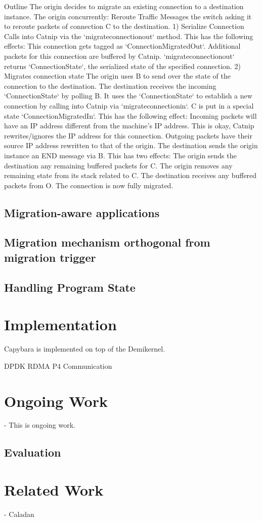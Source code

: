 Outline
The origin decides to migrate an existing connection to a destination instance.
The origin concurrently:
Reroute Traffic
Messages the switch asking it to reroute packets of connection C to the destination. 
1) Serialize Connection
Calls into Catnip via the `migrate\textunderscore{}connection\textunderscore{}out` method. This has the following effects:
This connection gets tagged as `ConnectionMigratedOut`.
Additional packets for this connection are buffered by Catnip.
`migrate\textunderscore{}connection\textunderscore{}out` returns `ConnectionState`, the serialized state of the specified connection.
2) Migrates connection state
The origin uses B to send over the state of the connection to the destination.
The destination receives the incoming `ConnectionState` by polling B. It uses the `ConnectionState` to establish a new connection by calling into Catnip via `migrate\textunderscore{}connection\textunderscore{}in`. C is put in a special state `ConnectionMigratedIn`. This has the following effect:
Incoming packets will have an IP address different from the machine’s IP address. This is okay, Catnip rewrites/ignores the IP address for this connection.
Outgoing packets have their source IP address rewritten to that of the origin.
The destination sends the origin instance an END message via B. This has two effects:
The origin sends the destination any remaining buffered packets for C.
The origin removes any remaining state from its stack related to C.
The destination receives any buffered packets from O.
The connection is now fully migrated.


\subsection{Migration-aware applications}
\subsection{Migration mechanism orthogonal from migration trigger}
\subsection{Handling Program State}

\section{Implementation}
Capybara is implemented on top of the Demikernel.

DPDK
RDMA
P4 Communication
\section{Ongoing Work}
- This is ongoing work.

\subsection{Evaluation}
\section{Related Work}
- Caladan